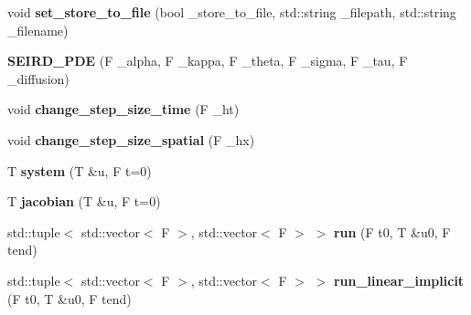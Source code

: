 \begin{DoxyCompactItemize}
\item 
\mbox{\label{classug_1_1epi_1_1_s_e_i_r_d___p_d_e_3_01_t_00_01seird_1_1_geometry_1_1_plane_01_4_aa399c391e02e88e7ad5524552810ba13}} 
void {\bfseries set\+\_\+store\+\_\+to\+\_\+file} (bool \+\_\+store\+\_\+to\+\_\+file, std\+::string \+\_\+filepath, std\+::string \+\_\+filename)
\item 
\mbox{\label{classug_1_1epi_1_1_s_e_i_r_d___p_d_e_3_01_t_00_01seird_1_1_geometry_1_1_plane_01_4_acee8173ad6d681ca2333dcccb7e60512}} 
{\bfseries S\+E\+I\+R\+D\+\_\+\+P\+DE} (F \+\_\+alpha, F \+\_\+kappa, F \+\_\+theta, F \+\_\+sigma, F \+\_\+tau, F \+\_\+diffusion)
\item 
\mbox{\label{classug_1_1epi_1_1_s_e_i_r_d___p_d_e_3_01_t_00_01seird_1_1_geometry_1_1_plane_01_4_a61447688b8d2efc8f873655d4ac608d5}} 
void {\bfseries change\+\_\+step\+\_\+size\+\_\+time} (F \+\_\+ht)
\item 
\mbox{\label{classug_1_1epi_1_1_s_e_i_r_d___p_d_e_3_01_t_00_01seird_1_1_geometry_1_1_plane_01_4_ac05da5b9ad1c004a4f727f92f8e9a6bd}} 
void {\bfseries change\+\_\+step\+\_\+size\+\_\+spatial} (F \+\_\+hx)
\item 
\mbox{\label{classug_1_1epi_1_1_s_e_i_r_d___p_d_e_3_01_t_00_01seird_1_1_geometry_1_1_plane_01_4_a674b90eb5d894a5552591332f5ec7400}} 
T {\bfseries system} (T \&u, F t=0)
\item 
\mbox{\label{classug_1_1epi_1_1_s_e_i_r_d___p_d_e_3_01_t_00_01seird_1_1_geometry_1_1_plane_01_4_ab3d8ae9995810401b7f0e0424aab0522}} 
T {\bfseries jacobian} (T \&u, F t=0)
\item 
\mbox{\label{classug_1_1epi_1_1_s_e_i_r_d___p_d_e_3_01_t_00_01seird_1_1_geometry_1_1_plane_01_4_ab79b175504e0ed645711bf3ef8edcac5}} 
std\+::tuple$<$ std\+::vector$<$ F $>$, std\+::vector$<$ F $>$ $>$ {\bfseries run} (F t0, T \&u0, F tend)
\item 
\mbox{\label{classug_1_1epi_1_1_s_e_i_r_d___p_d_e_3_01_t_00_01seird_1_1_geometry_1_1_plane_01_4_a2ce486c85f7932c90cce4a11ecb7f05b}} 
std\+::tuple$<$ std\+::vector$<$ F $>$, std\+::vector$<$ F $>$ $>$ {\bfseries run\+\_\+linear\+\_\+implicit} (F t0, T \&u0, F tend)
\end{DoxyCompactItemize}
